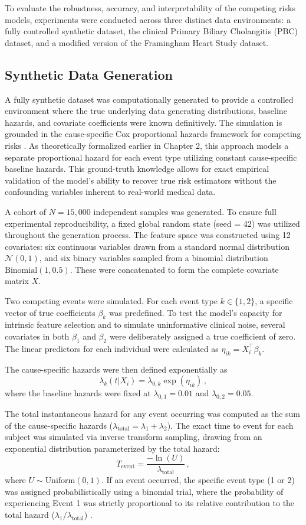 \documentclass[a4paper,twoside,12pt]{report}
\begin{document}
To evaluate the robustness, accuracy, and interpretability of the competing risks models, experiments were conducted across three distinct data environments: a fully controlled synthetic dataset, the clinical Primary Biliary Cholangitis (PBC) dataset, and a modified version of the Framingham Heart Study dataset.

\subsection{Synthetic Data Generation}
A fully synthetic dataset was computationally generated to provide a controlled environment where the true underlying data generating distributions, baseline hazards, and covariate coefficients were known definitively. The simulation is grounded in the cause-specific Cox proportional hazards framework for competing risks \citep{Cox1972, prentice1978analysis}. As theoretically formalized earlier in Chapter 2, this approach models a separate proportional hazard for each event type utilizing constant cause-specific baseline hazards. This ground-truth knowledge allows for exact empirical validation of the model's ability to recover true risk estimators without the confounding variables inherent to real-world medical data.

A cohort of $N = 15,000$ independent samples was generated. To ensure full experimental reproducibility, a fixed global random state (seed = 42) was utilized throughout the generation process. The feature space was constructed using 12 covariates: six continuous variables drawn from a standard normal distribution $\mathcal{N}(0, 1)$, and six binary variables sampled from a binomial distribution $\text{Binomial}(1, 0.5)$. These were concatenated to form the complete covariate matrix $X$.

Two competing events were simulated. For each event type $k \in \{1, 2\}$, a specific vector of true coefficients $\beta_k$ was predefined. To test the model's capacity for intrinsic feature selection and to simulate uninformative clinical noise, several covariates in both $\beta_1$ and $\beta_2$ were deliberately assigned a true coefficient of zero. The linear predictors for each individual were calculated as $\eta_{ik} = X_i^\top \beta_k$.

The cause-specific hazards were then defined exponentially as
$$\lambda_k(t|X_i) = \lambda_{0,k} \exp(\eta_{ik}) \,,$$
where the baseline hazards were fixed at $\lambda_{0,1} = 0.01$ and $\lambda_{0,2} = 0.05$. 

The total instantaneous hazard for any event occurring was computed as the sum of the cause-specific hazards ($\lambda_{\text{total}} = \lambda_1 + \lambda_2$). The exact time to event for each subject was simulated via inverse transform sampling, drawing from an exponential distribution parameterized by the total hazard:
$$T_{\text{event}} = \frac{-\ln(U)}{\lambda_{\text{total}}} \,,$$
where $U \sim \text{Uniform}(0,1)$. If an event occurred, the specific event type (1 or 2) was assigned probabilistically using a binomial trial, where the probability of experiencing Event 1 was strictly proportional to its relative contribution to the total hazard ($\lambda_1 / \lambda_{\text{total}}$) \citep{beyersmann2009simulating}.
\end{document}
